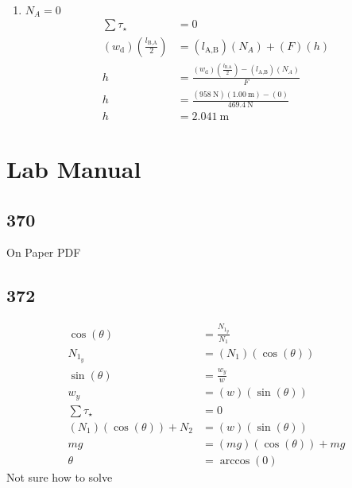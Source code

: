 \documentclass{article}
\begin{document}
\begin{enumerate}[label=\textbf{(\alph*)}]
	\item
		$ N_A = 0 $
		\begin{align*}
			\sum \tau_\star & = 0 \\
			(w_\text{d}) \left( \frac{l_\text{B,A}}{2} \right) & = (l_\text{A,B})(N_A) + (F)(h) \\
			h & = \frac{(w_\text{d}) \left( \frac{l_\text{B,A}}{2} \right) - (l_\text{A,B})(N_A)}{F} \\
			h & = \frac{(\SI{958}{\newton})(\SI{1.00}{\meter}) - (0)}{\SI{469.4}{\newton}} \\
			h & = \SI{2.041}{\meter}
		\end{align*}
\end{enumerate}

\section{Lab Manual}

\subsection{370}
On Paper PDF

\subsection{372}
\begin{align*}
	\cos(\theta) & = \frac{N_{1_y}}{N_1} \\
	N_{1_y} & = (N_1)(\cos(\theta)) \\
	\sin(\theta) & = \frac{w_y}{w} \\
	w_y & = (w)(\sin(\theta)) \\
	\sum \tau_\star & = 0 \\
	(N_1)(\cos(\theta)) + N_2 & = (w)(\sin(\theta)) \\
	mg & = (mg)(\cos(\theta)) + mg \\
	\theta & = \arccos(0)
\end{align*}
Not sure how to solve
\end{document}
